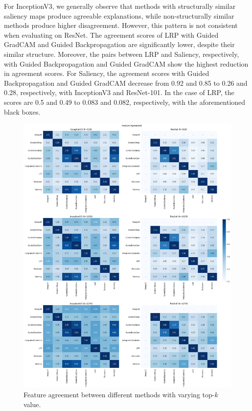 For InceptionV3, we generally observe that methods with structurally similar saliency maps produce agreeable explanations, while non-structurally similar methods produce higher disagreement. However, this pattern is not consistent when evaluating on ResNet. The agreement scores of LRP with Guided GradCAM and Guided Backpropagation are significantly lower, despite their similar structure. Moreover, the pairs between LRP and Saliency, respectively, with Guided Backpropagation and Guided GradCAM show the highest reduction in agreement scores. For Saliency, the agreement scores with Guided Backpropagation and Guided GradCAM decrease from 0.92 and 0.85 to 0.26 and 0.28, respectively, with InceptionV3 and ResNet-101. In the case of LRP, the scores are 0.5 and 0.49 to 0.083 and 0.082, respectively, with the aforementioned black boxes.

\begin{figure}[p]
    \centering
    \includegraphics[width=\textwidth]{images/results/feature-agreement.png}
    \caption{Feature agreement between different methods with varying top-$k$ value.}
    \label{fig:featureAgreement}
\end{figure}

